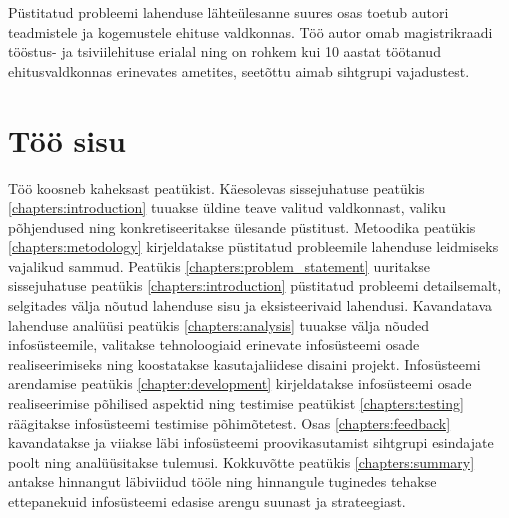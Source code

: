 Püstitatud probleemi lahenduse lähteülesanne suures osas toetub autori teadmistele ja kogemustele ehituse valdkonnas. Töö autor omab magistrikraadi
tööstus- ja tsiviilehituse erialal ning on rohkem kui 10 aastat töötanud ehitusvaldkonnas erinevates ametites, seetõttu aimab sihtgrupi vajadustest.

\section{Töö sisu}
Töö koosneb kaheksast peatükist. Käesolevas sissejuhatuse peatükis \ref{chapters:introduction} tuuakse üldine teave valitud valdkonnast, valiku 
põhjendused ning konkretiseeritakse ülesande püstitust. Metoodika peatükis \ref{chapters:metodology} kirjeldatakse püstitatud probleemile lahenduse leidmiseks
vajalikud sammud. Peatükis \ref{chapters:problem_statement} uuritakse sissejuhatuse peatükis \ref{chapters:introduction} püstitatud probleemi detailsemalt, 
selgitades välja nõutud lahenduse sisu ja eksisteerivaid lahendusi. Kavandatava lahenduse analüüsi peatükis \ref{chapters:analysis} tuuakse välja nõuded 
infosüsteemile, valitakse tehnoloogiaid erinevate infosüsteemi osade realiseerimiseks ning koostatakse kasutajaliidese disaini projekt. Infosüsteemi arendamise
peatükis \ref{chapter:development} kirjeldatakse infosüsteemi osade realiseerimise põhilised aspektid ning testimise peatükist \ref{chapters:testing} räägitakse
infosüsteemi testimise põhimõtetest. Osas \ref{chapters:feedback} kavandatakse ja viiakse läbi infosüsteemi proovikasutamist sihtgrupi esindajate poolt ning 
analüüsitakse tulemusi. Kokkuvõtte peatükis \ref{chapters:summary} antakse hinnangut läbiviidud tööle ning hinnangule tuginedes tehakse ettepanekuid infosüsteemi
edasise arengu suunast ja strateegiast.